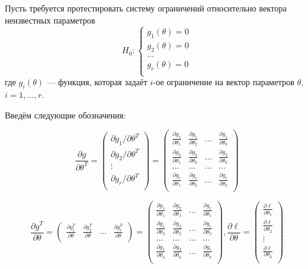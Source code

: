 \documentclass[12pt]{article}
\begin{document}
Пусть требуется протестировать систему ограничений относительно вектора неизвестных параметров
\[
H_0: \begin{cases}
g_1(\theta) = 0 \\
g_2(\theta) = 0 \\
\ldots \\
g_r(\theta) = 0 \\
\end{cases}
\]
где $g_i(\theta)$ — функция, которая задаёт $i$-ое ограничение на вектор параметров $\theta$, $i = 1,\ldots, r$.

Введём следующие обозначения: 

\[
\frac{\partial g}{\partial \theta^T} = \begin{pmatrix}
\partial g_1/\partial \theta^T \\
\partial g_2/\partial \theta^T \\
\vdots \\
\partial g_r/\partial \theta^T \\
\end{pmatrix} = \begin{pmatrix}
\frac{\partial g_1}{\partial \theta_1} & \frac{\partial g_1}{\partial \theta_2} & \ldots & \frac{\partial g_1}{\partial \theta_k}\\
\frac{\partial g_2}{\partial \theta_1} & \frac{\partial g_2}{\partial \theta_2} & \ldots & \frac{\partial g_2}{\partial \theta_k}\\
\ldots & \ldots & \ldots & \ldots \\
\frac{\partial g_r}{\partial \theta_1} & \frac{\partial g_r}{\partial \theta_2} & \ldots & \frac{\partial g_r}{\partial \theta_k}\\
\end{pmatrix}
\]

\[
\frac{\partial g^T}{\partial \theta} = \begin{pmatrix}
\frac{\partial g^T_1}{\partial \theta} & \frac{\partial g^T_2}{\partial \theta} & \ldots & \frac{\partial g^T_r}{\partial \theta} \\
\end{pmatrix} = \begin{pmatrix}
\frac{\partial g_1}{\partial \theta_1} & \frac{\partial g_2}{\partial \theta_1} & \ldots & \frac{\partial g_r}{\partial \theta_1}\\
\frac{\partial g_1}{\partial \theta_2} & \frac{\partial g_2}{\partial \theta_2} & \ldots & \frac{\partial g_r}{\partial \theta_2}\\
\ldots & \ldots & \ldots & \ldots \\
\frac{\partial g_1}{\partial \theta_k} & \frac{\partial g_2}{\partial \theta_k} & \ldots & \frac{\partial g_r}{\partial \theta_k}\\
\end{pmatrix},  \frac{\partial \ell}{\partial \theta}= \begin{pmatrix}
\frac{\partial \ell}{\partial \theta_1} \\
\frac{\partial \ell}{\partial \theta_2} \\
\vdots \\
\frac{\partial \ell}{\partial \theta_k} \\
\end{pmatrix}
\]
\end{document}

